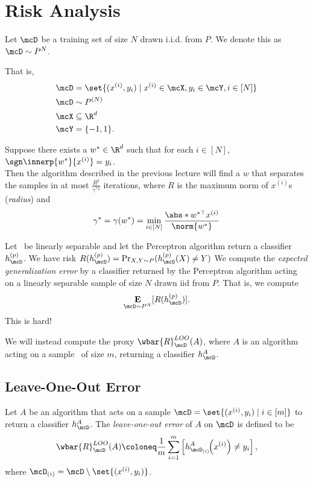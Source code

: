 \section{Risk Analysis} \label{sec:perceptron:risk}
Let $\mcD$ be a training set of size $N$ drawn i.i.d. from $P$.
We denote this as $\mcD \sim P^N$.

That is, \begin{align*}
    \mcD &= \set{(x^{(i)}, y_i) \mid x^{(i)} \in \mcX, y_i \in \mcY,
                                i \in [N]} \\
    \mcD &\sim P^{(N)} \\
    \mcX &\subseteq \R^d \\
    \mcY &= \pms.
\end{align*}

Suppose there exists a $w^* \in \R^d$ such that for each $i \in [N]$,
$\sgn \innerp{w^*}{x^{(i)}} = y_i$. \\
Then the algorithm described in the previous lecture will find a $w$ that
separates the samples in at most $\frac{R^2}{\gamma^{*2}}$ iterations,
where $R$ is the maximum norm of $x^{(i)}$s (\emph{radius}) and \[
    \gamma^* = \gamma(w^*)
        = \min_{i \in [N]} \frac{\abs*{w^{*\top} x^{(i)}}}{\norm{w^*}}
\]

Let \mcD\ be linearly separable and let the Perceptron algorithm return a
classifier $h_\mcD^{(p)}$.
We have risk $R(h_\mcD^{(p)}) = \Pr_{X, Y \sim P}(h_\mcD^{(p)}(X) \neq Y)$
We compute the \emph{expected generalization error} by a classifier returned
by the Perceptron algorithm acting on a linearly separable sample of size
$N$ drawn iid from $P$.
That is, we compute \[
    \E_{\mcD \sim P^{N}}[R(h_\mcD^{(p)})].
\] This is hard!

We will instead compute the proxy $\wbar{R}^{LOO}_\mcD(A)$, where $A$ is an
algorithm acting on a sample \mcD\ of size $m$, returning a classifier
$h_\mcD^{A}$.

\subsection{Leave-One-Out Error} \label{sec:loo}

\begin{definition*} \label{def:loo}
    Let $A$ be an algorithm that acts on a sample
    $\mcD = \set{(x^{(i)}, y_i) \mid i \in [m]}$ to return a
    classifier $h_\mcD^{A}$.
    The \emph{leave-one-out error} of $A$ on $\mcD$ is defined to be \[
        \wbar{R}^{LOO}_\mcD(A) \coloneq \frac1m \sum_{i=1}^{m}
            \left[h_{\mcD_{(i)}}^A\!\!\left(x^{(i)}\right) \ne y_i\right],
    \] where $\mcD_{(i)} = \mcD \setminus \set{(x^{(i)}, y_i)}$.
\end{definition*}

